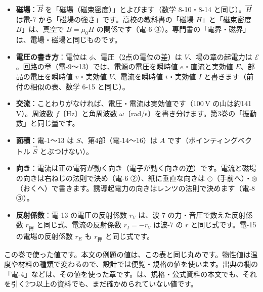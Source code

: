 {\small
\begin{itemize}[leftmargin=1.2\zw, itemsep=2pt, topsep=1pt, label={\color{bkVol}●}]
\item \textbf{磁場}：$\vec B$ を「磁場（磁束密度）」とよびます（数学 8-10・8-14 と同じ）。$\vec H$ は電-7 から「磁場の強さ」です。高校の教科書の「磁場 $H$」と「磁束密度 $B$」は、真空で $B=\mu_0H$ の関係です（電-6 ③）。専門書の「電界・磁界」は、電場・磁場と同じものです。
\item \textbf{電圧の書き方}：電位は $\phi$、電圧（2点の電位の差）は $V$、場の章の起電力は $\mathcal E$。回路の章（電-9〜13）では、電源の電圧を瞬時値 $e$・直流と実効値 $E$、部品の電圧を瞬時値 $v$・実効値 $V$、電流を瞬時値 $i$・実効値 $I$ と書きます（前付の相似の表、数学 6-15 と同じ）。
\item \textbf{交流}：ことわりがなければ、電圧・電流は実効値です（100\,V の山は約141\,V）。周波数 $f$〔Hz〕と角周波数 $\omega$〔rad/s〕を書き分けます。第3巻の「振動数」と同じ量です。
\item \textbf{面積}：電-1〜13 は $S$、第4部（電-14〜16）は $A$ です（ポインティングベクトル $\vec S$ とぶつけない）。
\item \textbf{向き}：電流は正の電荷が動く向き（電子が動く向きの逆）です。電流と磁場の向きは右ねじの法則で決め（電-6 ②）、紙に垂直な向きは $\odot$（手前へ）・$\otimes$（おくへ）で書きます。誘導起電力の向きはレンツの法則で決めます（電-8 ③）。
\item \textbf{反射係数}：電-13 の電圧の反射係数 $r_V$ は、波-7 の力・音圧で数えた反射係数 $r_{\text{押}}$ と同じ式、電流の反射係数 $r_I=-r_V$ は波-7 の $r$ と同じ式です。電-15 の電場の反射係数 $r_E$ も $r_{\text{押}}$ と同じ式です。
\end{itemize}\par}

{\small この巻で使った値です。本文の例題の値は、この表と同じ丸めです。物性値は温度や材料の種類で変わるので、設計では便覧・規格の値を使います。出典の欄の「電-4」などは、その値を使った章です。\phyk は、規格・公式資料の本文でも、それを引く2つ以上の資料でも、まだ確かめられていない値です。\par}


